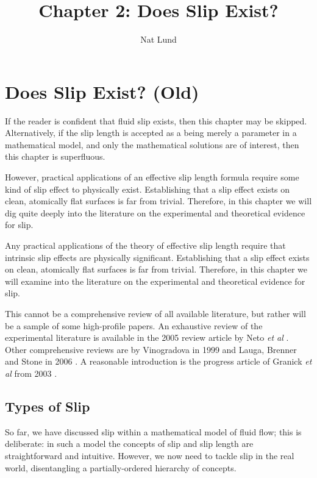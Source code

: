 \documentclass[12pt, a4paper, twoside, openright]{book}
\author{Nat Lund}
\title{Chapter 2: Does Slip Exist?}
\begin{document}
\chapter{Does Slip Exist? (Old)}

If the reader is confident that fluid slip exists, then this chapter may be skipped.  Alternatively, if the slip length is accepted as a being merely a parameter in a mathematical model, and only the mathematical solutions are of interest, then this chapter is superfluous.

However, practical applications of an effective slip length formula require some kind of slip effect to physically exist.  Establishing that a slip effect exists on clean, atomically flat surfaces is far from trivial.  Therefore, in this chapter we will dig quite deeply into the literature on the experimental and theoretical evidence for slip.

Any practical applications of the theory of effective slip length require that intrinsic slip effects are physically significant.  Establishing that a slip effect exists on clean, atomically flat surfaces is far from trivial.  Therefore, in this chapter we will examine into the literature on the experimental and theoretical evidence for slip.

This cannot be a comprehensive review of all available literature, but rather will be a sample of some high-profile papers.
An exhaustive review of the experimental literature is available in the 2005 review article by Neto \emph{et al} \cite{NetoReview2005}. Other comprehensive reviews are by Vinogradova in 1999 \cite{VinogradovaReview1999} and Lauga, Brenner and Stone in 2006 \cite{LaugaReview2006}. A reasonable introduction is the progress article of Granick \emph{et al} from 2003 \cite{GranickReview2003}.

\section*{Types of Slip}

So far, we have discussed slip within a mathematical model of fluid flow; this is deliberate: in such a model the concepts of slip and slip length are straightforward and intuitive. However, we now need to tackle slip in the real world, disentangling a partially-ordered hierarchy of concepts.
\end{document}
